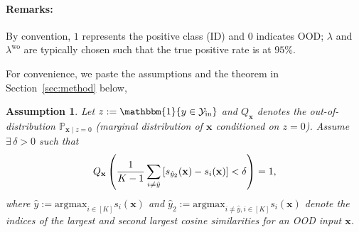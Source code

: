 \documentclass{article}
\def\*#1{\mathbf{#1}}
\newtheorem{assumption}{Assumption}[section]
\begin{document}
\paragraph{Remarks:} By convention, $1$ represents the positive class (ID) and $0$ indicates OOD; $\lambda$ and $\lambda^{\text{wo}}$ are typically chosen such that the true positive rate is at $95\%$.

For convenience, we paste the assumptions and the theorem in Section~\ref{sec:method} below,

\begin{assumption}
\label{thm:sep} Let $z := \mathbbm{1}\{y \in \mathcal{Y}_\text{in}\}$ and $Q_{\*x}$ denotes the out-of-distribution $\mathbb{P}_{\*x \mid z = 0}$ (marginal distribution of $\*x$ conditioned on $z = 0$). Assume $\exists\,\delta>0$ such that
$$
Q_{\*x}\left({1\over K-1}\sum_{i \neq \hat{y}}\left[s_{\hat{y}_{2}}(\*x)-s_{i}(\*x)\right]< \delta\right)=1,
$$
where $\hat y := \text{argmax}_{i\in[K]} s_i(\*x)$ and $\hat y_2 := \text{argmax}_{i\neq \hat y, i\in[K]} s_i(\*x)$ denote the indices of the largest and second largest cosine similarities for an OOD input $\*x$. 
\end{assumption}
\end{document}
